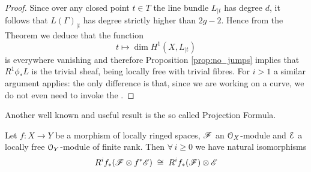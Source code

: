 	\begin{proof}
		Since over any closed point $t \in T$ the line bundle $L_{\mid t}$ has degree $d$, it follows that $L(\Gamma)_{\mid t}$ has degree strictly higher than $2g-2$. Hence from the \RR Theorem we deduce that the function
		$$ t \mapsto \dim H^1(X, L_{\mid t}) $$
		is everywhere vanishing and therefore Proposition \ref{prop:no_jumps} implies that $R^1\phi_* L$ is the trivial sheaf, being locally free with trivial fibres. For $i>1$ a similar argument applies: the only difference is that, since we are working on a curve, we do not even need to invoke the \RRo.
	\end{proof}

	Another well known and useful result is the so called Projection Formula.
	\begin{namedtheo}\label{thm:projection_formula}
		Let $f:X\to Y$ be a morphism of locally ringed spaces, $\mathscr{F}$ an $\mathcal{O}_X$-module and $\cal{E}$ a locally free $\mathcal{O}_Y$-module of finite rank. Then $\forall\, i \geq 0$ we have natural isomorphisms
		\begin{equation}\label{eq:proj_formula}
			R^i f_*( \mathscr{F}\otimes f^* \mathscr{E} ) \;\cong\; R^i f_*( \mathscr{F}) \otimes \mathscr{E}
		\end{equation}
	\end{namedtheo}
